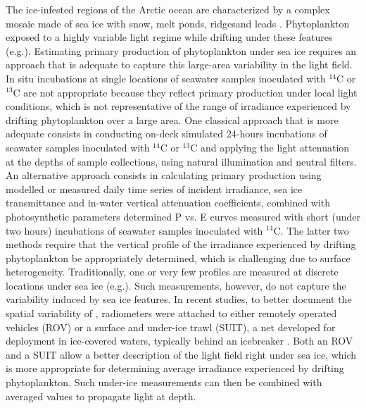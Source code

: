 The ice-infested regions of the Arctic ocean are characterized by a complex mosaic made of sea ice with snow, melt ponds, ridges\DIFaddbegin \DIFadd{, }\DIFaddend and leads \citep{Nicolaus2013, Katlein2015, Katlein2016}. Phytoplankton \DIFdelbegin {}\DIFdelend \DIFaddbegin {}\DIFaddend exposed to a highly variable light regime while drifting under these \DIFaddbegin {}\DIFaddend features (e.g.\DIFaddbegin \DIFadd{, }\DIFaddend \citet{Lange2017}). Estimating primary production of phytoplankton under sea ice requires an approach that is adequate to capture this large-area variability in the light field. In situ incubations at single locations of seawater samples inoculated with $^{14}$C or $^{13}$C are not appropriate because they reflect primary production under local light conditions, which is not representative of the range of irradiance experienced by drifting phytoplankton over a large area. One classical approach that is more adequate consists in conducting on-deck simulated 24-hours incubations of seawater samples inoculated with $^{14}$C or $^{13}$C and applying the light attenuation at the depths of sample collections, using natural illumination and neutral filters. An alternative approach consists in calculating primary production using modelled or measured daily time series of incident irradiance, sea ice transmittance and in-water vertical attenuation coefficients, combined with photosynthetic parameters determined \DIFdelbegin {}\DIFdelend \DIFaddbegin {}\DIFaddend P vs. E curves measured with short (under two hours) incubations of seawater samples inoculated with $^{14}$C. The latter two methods require that the vertical profile of the irradiance experienced by drifting phytoplankton be appropriately determined, which is challenging due to surface heterogeneity. Traditionally, one or very few \edz{} profiles are measured at discrete locations under sea ice (e.g.\DIFaddbegin \DIFadd{, }\DIFaddend \citet{Mundy2009}). Such measurements, however, do not capture the variability induced by sea ice features. In recent studies, to better document the spatial variability of \edz{}, radiometers were attached to either remotely operated vehicles (ROV) \citep{Katlein2015} or a surface and under-ice trawl (SUIT), a net developed for deployment in ice-covered waters, typically behind an icebreaker \citep{Lange2017}. Both an ROV and a SUIT allow a better description of the light field right under sea ice, which is more appropriate for determining average irradiance experienced by drifting phytoplankton. Such under-ice measurements can then be combined with averaged \ked{} values to propagate light at depth.

